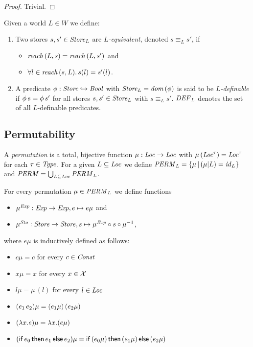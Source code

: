 \documentclass[12pt,a4paper]{report}
\newcommand{\Sto}{\nstyle{Sto}}
\newcommand{\DEF}{\nstyle{DEF}}
\newcommand{\PERM}{\nstyle{PERM}}
\newcommand{\id}{\nstyle{id}}
\begin{document}
\begin{proof}
  Trivial.
\end{proof}

\begin{definition}
  Given a world $L \in W$ we define:
  \begin{enumerate}
    \item Two stores $s,s'\in\mathit{Store}_L$ are {\em $L$-equivalent}, denoted $s \equiv_L s'$, if
          \begin{itemize}
            \item $\mathit{reach}\,(L,s) = \mathit{reach}\,(L,s')$ and
            \item $\forall l\in\mathit{reach}\,(s,L).\,s(l)=s'(l)$.
          \end{itemize}

    \item A predicate $\phi:\mathit{Store} \hookrightarrow \mathit{Bool}$ with $\mathit{Store}_L = \mathit{dom}\,(\phi)$ is said to be
          {\em $L$-definable} if $\phi\,s = \phi\,s'$ for all stores
          $s,s'\in\mathit{Store}_L$ with $s \equiv_L s'$. $\DEF_L$ denotes the set of all $L$-definable
          predicates.
  \end{enumerate}
\end{definition}



\subsection{Permutability}

\begin{definition}[Permutation]
  A {\em permutation} is a total, bijective function $\mu:\mathit{Loc}\to\mathit{Loc}$ with
  $\mu\,(\mathit{Loc}^\tau)=\mathit{Loc}^\tau$ for each $\tau\in\mathit{Type}$.
  For a given $L \subseteq \mathit{Loc}$ we define $\PERM_L = \{\mu\,|\,(\mu|L) = \id_L\}$
  and $\PERM = \bigcup_{L\subseteq\Loc} \PERM_L$.
\end{definition}

For every permutation $\mu \in \PERM_L$ we define functions 
\begin{itemize}
  \item $\mu^{\mathit{Exp}}:\mathit{Exp} \to \mathit{Exp}, e \mapsto e\mu$ and
  \item $\mu^\Sto:\Store \to \Store, s \mapsto \mu^\Exp \circ s \circ \mu^{-1}$,
\end{itemize}
where $e\mu$ is inductively defined as follows:
\begin{itemize}
  \item $c\mu = c$ for every $c \in \mathit{Const}$
  \item $x\mu = x$ for every $x \in \mathcal{X}$
  \item $l\mu = \mu\,(l)$ for every $l \in \mathit{Loc}$
  \item $(e_1\,e_2)\mu = (e_1\mu)\,(e_2\mu)$
  \item $(\lambda x.e)\mu = \lambda x.(e\mu)$
  \item $(\mathsf{if}\,e_0\,\mathsf{then}\,e_1\,\mathsf{else}\,e_2)\mu = \mathsf{if}\,(e_0\mu)\,\mathsf{then}\,(e_1\mu)\,\mathsf{else}\,(e_2\mu)$
\end{itemize}
\end{document}

